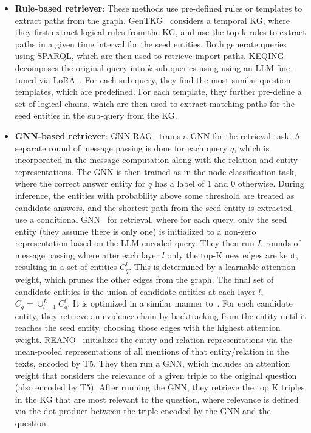 \begin{itemize}[leftmargin=*]
    \item {\bf Rule-based retriever}: These methods use pre-defined rules or templates to extract paths from the graph. GenTKG~\cite{liao2024gentkg} considers a temporal KG, where they first extract logical rules from the KG, and use the top k rules to extract paths in a given time interval for the seed entities. Both \cite{dai2024counter, luo2023chatkbqa} generate queries using SPARQL, which are then used to retrieve import paths. KEQING~\cite{keqing} decomposes the original query into $k$ sub-queries using using an LLM fine-tuned via LoRA~\cite{hulora}. For each sub-query, they find the most similar question templates, which are predefined. For each template, they further pre-define a set of logical chains, which are then used to extract matching paths for the seed entities in the sub-query from the KG. 
    
    \item {\bf GNN-based retriever}: GNN-RAG~\cite{mavromatis2024gnn} trains a GNN for the retrieval task. A separate round of message passing is done for each query $q$, which is incorporated in the message computation along with the relation and entity representations. The GNN is then trained as in the node classification task, where the correct answer entity for $q$ has a label of 1 and 0 otherwise. During inference, the entities with probability above some threshold are treated as candidate answers, and the shortest path from the seed entity is extracted. \citet{gnn_llm} use a conditional GNN~\cite{conditional_mpnn} for retrieval, where for each query, only the seed entity (they assume there is only one) is initialized to a non-zero representation based on the LLM-encoded query. They then run $L$ rounds of message passing where after each layer $l$ only the top-K new edges are kept, resulting in a set of entities $C_q^l$. This is determined by a learnable attention weight, which prunes the other edges from the graph. The final set of candidate entities is the union of candidate entities at each layer $l$, $C_q = \cup_{l=1}^L C_q^l$. It is optimized in a similar manner to~\cite{mavromatis2024gnn}. For each candidate entity, they retrieve an evidence chain by backtracking from the entity until it reaches the seed entity, choosing those edges with the highest attention weight.
    REANO~\cite{fang2024reano} initializes the entity and relation representations via the mean-pooled representations of all mentions of that entity/relation in the texts, encoded by T5. They then run a GNN, which includes an attention weight that considers the relevance of a given triple to the original question (also encoded by T5). After running the GNN, they retrieve the top K triples in the KG that are most relevant to the question, where relevance is defined via the dot product between the triple encoded by the GNN and the question.  


\end{itemize}
